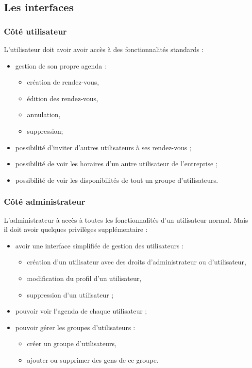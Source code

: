 \documentclass[a4paper, 11pt]{report}
\begin{document}
    \subsection{Les interfaces}
        \subsubsection{Côté utilisateur}
        L'utilisateur doit avoir avoir accès à des fonctionnalités standards :
        \begin{itemize}
            \item gestion de son propre agenda :
            \begin{itemize}
                \item création de rendez-vous,
                \item édition des rendez-vous,
                \item annulation,
                \item suppression;
            \end{itemize}
            \item possibilité d'inviter d'autres utilisateurs à ses rendez-vous ;
            \item possibilité de voir les horaires d'un autre utilisateur de l'entreprise ;
            \item possibilité de voir les disponibilités de tout un groupe d'utilisateurs.
        \end{itemize}
        \subsubsection{Côté administrateur}
        L'administrateur à accès à toutes les fonctionnalités d'un utilisateur normal. Mais il doit avoir quelques privilèges supplémentaire :
        \begin{itemize}
            \item avoir une interface simplifiée de gestion des utilisateurs :
            \begin{itemize}
                \item création d'un utilisateur avec des droits d'administrateur ou d'utilisateur,
                \item modification du profil d'un utilisateur,
                \item suppression d'un utilisateur ;
            \end{itemize}
            \item pouvoir voir l'agenda de chaque utilisateur ;
            \item pouvoir gérer les groupes d'utilisateurs :
            \begin{itemize}
                \item créer un groupe d'utilisateurs,
                \item ajouter ou supprimer des gens de ce groupe.
            \end{itemize}
        \end{itemize}
\end{document}
